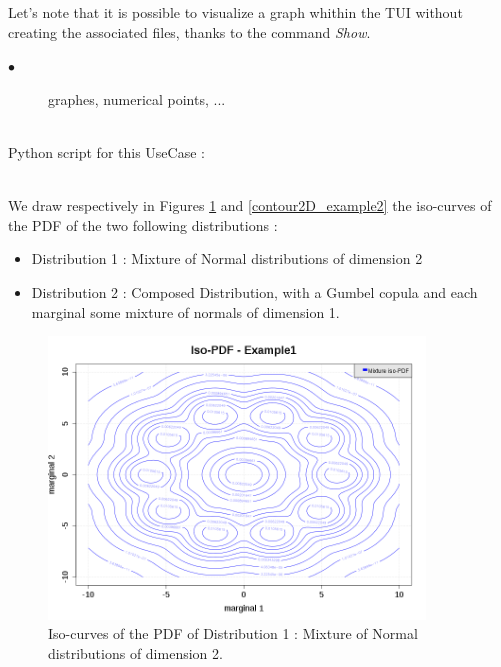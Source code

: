 Let's note that it is possible to visualize a graph whithin the TUI without creating the associated files, thanks to the command {\itshape Show}.\\

\noindent%
{
  \begin{description}
  \item[$\bullet$] graphes, numerical points, ...
  \end{description}
}

\textspace\\
Python script for this UseCase :


\textspace\\


We draw respectively  in Figures \ref{tulipe} and \ref{contour2D_example2} the iso-curves of the PDF of the two following  distributions :
\begin{itemize}
\item Distribution 1 : Mixture of Normal distributions of dimension 2
\item Distribution 2 : Composed Distribution, with a Gumbel copula and each marginal some mixture of normals of dimension 1.
\end{itemize}



\begin{figure}[H]
  \begin{center}
    \includegraphics[width=10cm]{Figures/contour2D_tulipe.png}
  \end{center}
  \caption{Iso-curves of the PDF of Distribution 1 : Mixture of Normal distributions of dimension 2.}
  \label{tulipe}
\end{figure}

